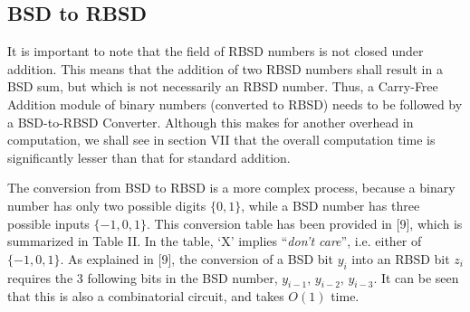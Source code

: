 \documentclass[conference]{IEEEtran_NCC}
\begin{document}
\subsection{BSD to RBSD}

It is important to note that the field of RBSD numbers is not closed under addition. This means that the addition of two RBSD numbers shall result in a BSD sum, but which is not necessarily an RBSD number. Thus, a Carry-Free Addition module of binary numbers (converted to RBSD) needs to be followed by a BSD-to-RBSD Converter. Although this makes for another overhead in computation, we shall see in section VII that the overall computation time is significantly lesser than that for standard addition.

The conversion from BSD to RBSD is a more complex process, because a binary number has only two possible digits $\{0, 1\}$, while a BSD number has three possible inputs $\{-1, 0, 1\}$. This conversion table has been provided in [9], which is summarized in Table II. In the table, `X' implies ``\textit{don't care}'', i.e. either of $\{-1, 0, 1\}$. As explained in [9], the conversion of a BSD bit $y_{i}$ into an RBSD bit $z_{i}$ requires the 3 following bits in the BSD number, $y_{i-1}$, $y_{i-2}$, $y_{i-3}$. It can be seen that this is also a combinatorial circuit, and takes $O(1)$ time.
\end{document}
